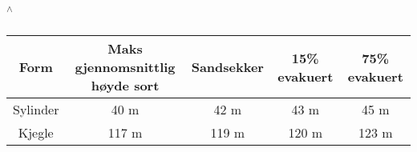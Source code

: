 
\textbf{\textsuperscript{$\wedge$}}


\begin{table}
\begin{center}
 \begin{tabular}{||c|| c| c| c| c||} 
 \hline
 Form & Maks gjennomsnittlig høyde sort & Sandsekker & 15\% evakuert & 75\% evakuert \\ [0.5ex] 
 \hline\hline
 Sylinder & 40 m & 42 m & 43 m & 45 m\\ 
 \hline
 Kjegle & 117 m & 119 m & 120 m & 123 m\\ [1ex]
 \hline
\end{tabular}
\end{center}
\caption{ }
\label{table:tab2}
\end{table}